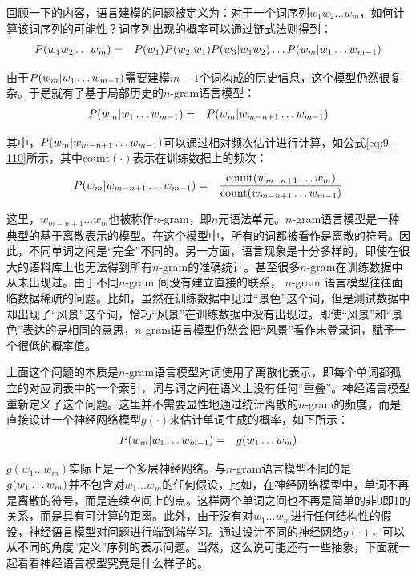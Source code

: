 \parinterval  回顾一下{\chaptertwo}的内容，语言建模的问题被定义为：对于一个词序列$ w_1w_2\dots w_m$，如何计算该词序列的可能性？词序列出现的概率可以通过链式法则得到：
\begin{eqnarray}
{P}(w_1w_2\dots w_m)&=&{P}(w_1){P}(w_2|w_1){P}(w_3|w_1w_2)\dots {P}(w_m|w_1\dots w_{m-1})
\label{eq:9-57}
\end{eqnarray}

\parinterval  由于$ {P}(w_m|w_1\dots w_{m-1}) $需要建模$ m-1 $个词构成的历史信息，这个模型仍然很复杂。于是就有了基于局部历史的$n$-gram语言模型：
\begin{eqnarray}
{P}(w_m|w_1\dots w_{m-1})&=&{P}(w_m|w_{m-n+1}\dots w_{m-1})
\label{eq:9-58}
\end{eqnarray}

\noindent  其中，${P}(w_m|w_{m-n+1}\dots w_{m-1}) $可以通过相对频次估计进行计算，如公式\eqref{eq:9-110}所示，其中$ {\textrm{count}}(\cdot) $表示在训练数据上的频次：
\begin{eqnarray}
{P}(w_m|w_{m-n+1}\dots w_{m-1})&=&\frac{{\textrm{count}}(w_{m-n+1}\dots w_m)}{{\textrm{count}}(w_{m-n+1}\dots w_{m-1})}
\label{eq:9-110}
\end{eqnarray}

\noindent 这里，$ w_{m-n+1}\dots w_m $也被称作$n$-gram，即$ n $元语法单元。$n$-gram语言模型是一种典型的基于离散表示的模型。在这个模型中，所有的词都被看作是离散的符号。因此，不同单词之间是“完全”不同的。另一方面，语言现象是十分多样的，即使在很大的语料库上也无法得到所有$n$-gram的准确统计。甚至很多$n$-gram在训练数据中从未出现过。由于不同$n$-gram 间没有建立直接的联系， $n$-gram 语言模型往往面临数据稀疏的问题。比如，虽然在训练数据中见过“景色”这个词，但是测试数据中却出现了“风景”这个词，恰巧“风景”在训练数据中没有出现过。即使“风景”和“景色”表达的是相同的意思，$n$-gram语言模型仍然会把“风景”看作未登录词，赋予一个很低的概率值。

\parinterval  上面这个问题的本质是$n$-gram语言模型对词使用了离散化表示，即每个单词都孤立的对应词表中的一个索引，词与词之间在语义上没有任何“重叠”。神经语言模型重新定义了这个问题。这里并不需要显性地通过统计离散的$n$-gram的频度，而是直接设计一个神经网络模型$ g(\cdot)$来估计单词生成的概率，如下所示：
\begin{eqnarray}
{P}(w_m|w_1\dots w_{m-1})&=&g(w_1\dots w_m)
\label{eq:9-59}
\end{eqnarray}

\vspace{-0.4em}
\parinterval  $ g(w_1\dots w_m) $实际上是一个多层神经网络。与$n$-gram语言模型不同的是$ g(w_1\dots \\ w_m) $并不包含对$ w_1\dots w_m $的任何假设，比如，在神经网络模型中，单词不再是离散的符号，而是连续空间上的点。这样两个单词之间也不再是简单的非0即1的关系，而是具有可计算的距离。此外，由于没有对$ w_1\dots w_m $进行任何结构性的假设，神经语言模型对问题进行端到端学习。通过设计不同的神经网络$ g(\cdot)$，可以从不同的角度“定义”序列的表示问题。当然，这么说可能还有一些抽象，下面就一起看看神经语言模型究竟是什么样子的。

